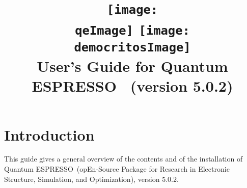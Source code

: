 \documentclass[12pt,a4paper]{article}
\def\version{5.0.2}
\def\qe{{\sc Quantum ESPRESSO}}
\begin{document}
 
\author{}
\date{}

\def\qeImage{quantum_espresso.pdf}
\def\democritosImage{democritos.pdf}

\begin{htmlonly}
\def\qeImage{quantum_espresso.png}
\def\democritosImage{democritos.png}
\end{htmlonly}

\title{
  \texttt{[image: \\qeImage]} \hskip 2cm
  \texttt{[image: \\democritosImage]}\\
  \vskip 1cm
  \Huge User's Guide for \qe\ \smallskip
  \Large (version \version)
}


\maketitle

\tableofcontents

\section{Introduction}

This guide gives a general overview of the contents and of the installation 
of \qe\ (opEn-Source Package for Research in Electronic Structure, Simulation,
and Optimization), version \version.
\end{document}
